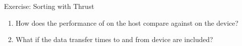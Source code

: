 \documentclass[aspectratio=43]{beamer}
\begin{document}
\begin{frame}[fragile]{Exercise: Sorting with Thrust}

    \begin{enumerate}
        \item How does the performance of  on the host compare against 
                on the device?
        \item What if the data transfer times to and from device are included?
    \end{enumerate}
\end{frame}
\end{document}
